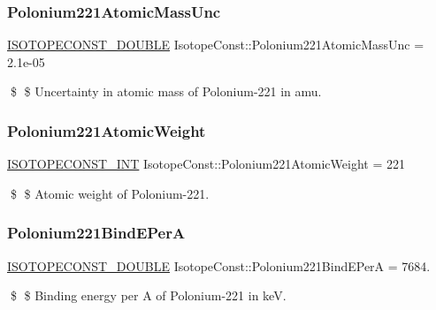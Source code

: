 \subsubsection{\texorpdfstring{Polonium221\+Atomic\+Mass\+Unc}{Polonium221AtomicMassUnc}}
{\footnotesize\ttfamily \mbox{\hyperlink{group___isotope_const-_macros_ga8f45a7272ce02c0b4c65c44636ed719a}{I\+S\+O\+T\+O\+P\+E\+C\+O\+N\+S\+T\+\_\+\+D\+O\+U\+B\+LE}} Isotope\+Const\+::\+Polonium221\+Atomic\+Mass\+Unc = 2.\+1e-\/05}

\$ \$ Uncertainty in atomic mass of Polonium-\/221 in amu. \mbox{\label{group___isotope_const-_polonium-_po221_gaa12ac705a5d815e6845b3fec48907cdb}} 
\subsubsection{\texorpdfstring{Polonium221\+Atomic\+Weight}{Polonium221AtomicWeight}}
{\footnotesize\ttfamily \mbox{\hyperlink{group___isotope_const-_macros_ga5f18360b3e99483a35c32d789e62621c}{I\+S\+O\+T\+O\+P\+E\+C\+O\+N\+S\+T\+\_\+\+I\+NT}} Isotope\+Const\+::\+Polonium221\+Atomic\+Weight = 221}

\$ \$ Atomic weight of Polonium-\/221. \mbox{\label{group___isotope_const-_polonium-_po221_gace513aa897d186cce21db18a31b88f3d}} 
\subsubsection{\texorpdfstring{Polonium221\+Bind\+E\+PerA}{Polonium221BindEPerA}}
{\footnotesize\ttfamily \mbox{\hyperlink{group___isotope_const-_macros_ga8f45a7272ce02c0b4c65c44636ed719a}{I\+S\+O\+T\+O\+P\+E\+C\+O\+N\+S\+T\+\_\+\+D\+O\+U\+B\+LE}} Isotope\+Const\+::\+Polonium221\+Bind\+E\+PerA = 7684.}

\$ \$ Binding energy per A of Polonium-\/221 in keV. \mbox{\label{group___isotope_const-_polonium-_po221_gae882504366358f4c5ef70f4c170511be}} 
